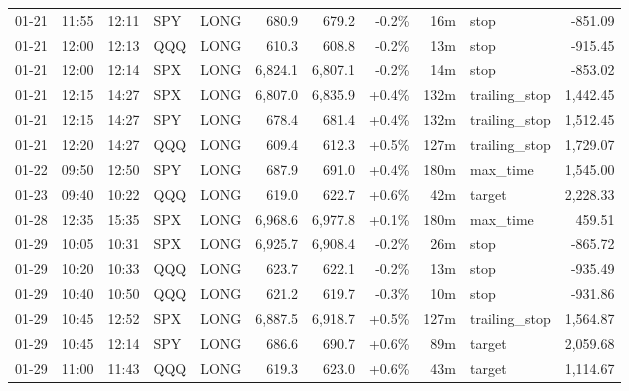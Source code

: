 \documentclass[11pt,a4paper,twoside]{article}
\begin{document}
\begin{center}
\begin{longtable}{>{\color{txtmain}}l l l l l r r r r >{\color{txtmain}}l r}
01-21 & 11:55 & 12:11 & SPY & LONG & 680.9 & 679.2 & \textcolor{lossred}{-0.2\%} & 16m & stop & \textcolor{lossred}{-851.09} \\
01-21 & 12:00 & 12:13 & QQQ & LONG & 610.3 & 608.8 & \textcolor{lossred}{-0.2\%} & 13m & stop & \textcolor{lossred}{-915.45} \\
01-21 & 12:00 & 12:14 & SPX & LONG & 6,824.1 & 6,807.1 & \textcolor{lossred}{-0.2\%} & 14m & stop & \textcolor{lossred}{-853.02} \\
01-21 & 12:15 & 14:27 & SPX & LONG & 6,807.0 & 6,835.9 & \textcolor{wingreen}{+0.4\%} & 132m & trailing\_stop & \textcolor{wingreen}{1,442.45} \\
01-21 & 12:15 & 14:27 & SPY & LONG & 678.4 & 681.4 & \textcolor{wingreen}{+0.4\%} & 132m & trailing\_stop & \textcolor{wingreen}{1,512.45} \\
01-21 & 12:20 & 14:27 & QQQ & LONG & 609.4 & 612.3 & \textcolor{wingreen}{+0.5\%} & 127m & trailing\_stop & \textcolor{wingreen}{1,729.07} \\
01-22 & 09:50 & 12:50 & SPY & LONG & 687.9 & 691.0 & \textcolor{wingreen}{+0.4\%} & 180m & max\_time & \textcolor{wingreen}{1,545.00} \\
01-23 & 09:40 & 10:22 & QQQ & LONG & 619.0 & 622.7 & \textcolor{wingreen}{+0.6\%} & 42m & target & \textcolor{wingreen}{2,228.33} \\
01-28 & 12:35 & 15:35 & SPX & LONG & 6,968.6 & 6,977.8 & \textcolor{wingreen}{+0.1\%} & 180m & max\_time & \textcolor{wingreen}{459.51} \\
01-29 & 10:05 & 10:31 & SPX & LONG & 6,925.7 & 6,908.4 & \textcolor{lossred}{-0.2\%} & 26m & stop & \textcolor{lossred}{-865.72} \\
01-29 & 10:20 & 10:33 & QQQ & LONG & 623.7 & 622.1 & \textcolor{lossred}{-0.2\%} & 13m & stop & \textcolor{lossred}{-935.49} \\
01-29 & 10:40 & 10:50 & QQQ & LONG & 621.2 & 619.7 & \textcolor{lossred}{-0.3\%} & 10m & stop & \textcolor{lossred}{-931.86} \\
01-29 & 10:45 & 12:52 & SPX & LONG & 6,887.5 & 6,918.7 & \textcolor{wingreen}{+0.5\%} & 127m & trailing\_stop & \textcolor{wingreen}{1,564.87} \\
01-29 & 10:45 & 12:14 & SPY & LONG & 686.6 & 690.7 & \textcolor{wingreen}{+0.6\%} & 89m & target & \textcolor{wingreen}{2,059.68} \\
01-29 & 11:00 & 11:43 & QQQ & LONG & 619.3 & 623.0 & \textcolor{wingreen}{+0.6\%} & 43m & target & \textcolor{wingreen}{1,114.67} \\

\end{longtable}
\end{center}
\end{document}
